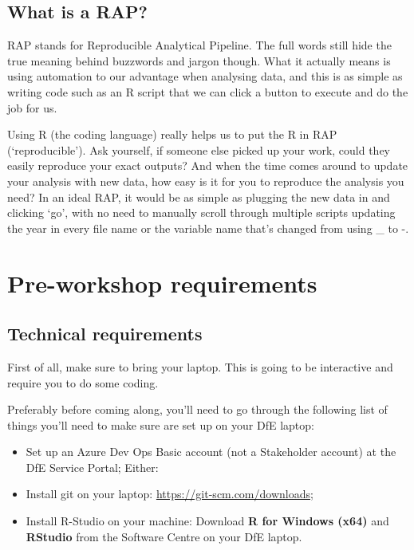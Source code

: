 \documentclass[
  12pt,
]{article}
\begin{document}
\hypertarget{what-is-a-rap}{%
\subsection{What is a RAP?}\label{what-is-a-rap}}

RAP stands for Reproducible Analytical Pipeline. The full words still
hide the true meaning behind buzzwords and jargon though. What it
actually means is using automation to our advantage when analysing data,
and this is as simple as writing code such as an R script that we can
click a button to execute and do the job for us.

Using R (the coding language) really helps us to put the R in RAP
(`reproducible'). Ask yourself, if someone else picked up your work,
could they easily reproduce your exact outputs? And when the time comes
around to update your analysis with new data, how easy is it for you to
reproduce the analysis you need? In an ideal RAP, it would be as simple
as plugging the new data in and clicking `go', with no need to manually
scroll through multiple scripts updating the year in every file name or
the variable name that's changed from using \_ to -.

\hypertarget{pre-workshop-requirements}{%
\section{Pre-workshop requirements}\label{pre-workshop-requirements}}

\hypertarget{technical-requirements}{%
\subsection{Technical requirements}\label{technical-requirements}}

First of all, make sure to bring your laptop. This is going to be
interactive and require you to do some coding.

Preferably before coming along, you'll need to go through the following
list of things you'll need to make sure are set up on your DfE laptop:

\begin{itemize}
\item
  Set up an Azure Dev Ops Basic account (not a Stakeholder account) at
  the DfE Service Portal; Either:
\item
  Install git on your laptop: \url{https://git-scm.com/downloads};
\item
  Install R-Studio on your machine: Download \textbf{R for Windows
  (x64)} and \textbf{RStudio} from the Software Centre on your DfE
  laptop.
\end{itemize}
\end{document}
